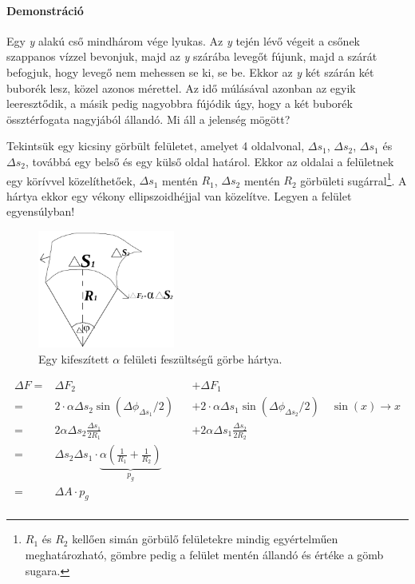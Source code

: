 \documentclass[12pt,a4paper]{scrartcl}
\begin{document}
\footnotesize
\paragraph{Demonstráció} Egy \textit{y} alakú cső mindhárom vége lyukas. Az \textit{y} tején lévő végeit a csőnek szappanos vízzel bevonjuk, majd az \textit{y} szárába levegőt fújunk, majd a szárát befogjuk, hogy levegő nem mehessen se ki, se be. Ekkor az \textit{y} két szárán két buborék lesz, közel azonos mérettel. Az idő múlásával azonban az egyik leeresztődik, a másik pedig nagyobbra fújódik úgy, hogy a két buborék össztérfogata nagyjából állandó. Mi áll a jelenség mögött?
\normalsize

Tekintsük egy kicsiny görbült felületet, amelyet 4 oldalvonal, $\Delta {s_1}$, $\Delta {s_2}$, $\Delta {s_1}$ és $\Delta {s_2}$, továbbá egy belső és egy külső oldal határol. Ekkor az oldalai a felületnek egy körívvel közelíthetőek, $\Delta {s_1}$ mentén $R_1$, $\Delta {s_2}$ mentén $R_2$ görbületi sugárral\footnote{$R_1$ és $R_2$ kellően simán görbülő felületekre mindig egyértelműen meghatározható, gömbre pedig a felület mentén állandó és értéke a gömb sugara.}. A hártya ekkor egy vékony ellipszoidhéjjal van közelítve. Legyen a felület egyensúlyban!

\begin{figure}[htbp]
	\begin{center}
		\includegraphics[width=0.4\textwidth]{tetel73.png}
		\caption{Egy kifeszített $\alpha$ felületi feszültségű görbe hártya. }
	\end{center}
\end{figure}

\[\begin{aligned}
  \Delta F =  & \Delta {F_2} &  &  + \Delta {F_1} \\ 
   =  & 2 \cdot \alpha \Delta {s_2}\sin \left( {\Delta {\phi _{\Delta {s_1}}}/2} \right) &  &  + 2 \cdot \alpha \Delta {s_1}\sin \left( {\Delta {\phi _{\Delta {s_2}}}/2} \right)\quad \sin \left( x \right) \to x \\ 
   =  & 2\alpha \Delta {s_2}\frac{{\Delta {s_1}}}{{2{R_1}}} &  &  + 2\alpha \Delta {s_1}\frac{{\Delta {s_2}}}{{2{R_2}}} \\ 
   =  & \Delta {s_2}\Delta {s_1} \cdot \underbrace {\alpha \left( {\frac{1}{{{R_1}}} + \frac{1}{{{R_2}}}} \right)}_{{p_g}} \\ 
   =  & \Delta A \cdot {p_g} \\ 
\end{aligned} \]
\end{document}
